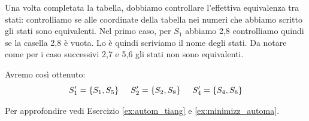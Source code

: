 Una volta completata la tabella, dobbiamo controllare l'effettiva equivalenza tra stati: controlliamo se alle coordinate della tabella nei numeri che abbiamo scritto gli stati sono equivalenti. Nel primo caso, per $S_1$ abbiamo 2,8 controlliamo quindi se la casella 2,8 è vuota. Lo è quindi scriviamo il nome degli stati. Da notare come per i caso successivi 2,7 e 5,6 gli stati non sono equivalenti.

Avremo così ottenuto:
\begin{equation*}
    S_1'=\{S_1,S_5\}\hspace{0,5cm}S_2'=\{S_2,S_8\}\hspace{0,5cm}S_4'=\{S_4,S_6\}
\end{equation*}

Per approfondire vedi Esercizio \ref{ex:autom_tiang} e \ref{ex:minimizz_automa}.

\newpage
